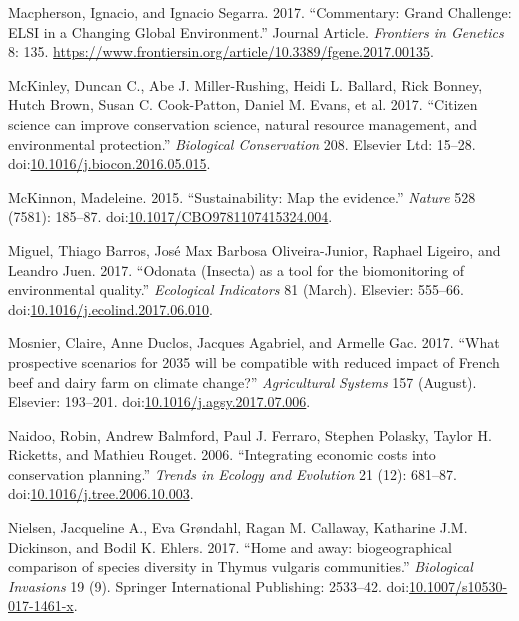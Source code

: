 \documentclass[fleqn,10pt]{wlpeerj} %
\begin{document}
\hypertarget{ref-Macpherson2017}{}
Macpherson, Ignacio, and Ignacio Segarra. 2017. ``Commentary: Grand
Challenge: ELSI in a Changing Global Environment.'' Journal Article.
\emph{Frontiers in Genetics} 8: 135.
\url{https://www.frontiersin.org/article/10.3389/fgene.2017.00135}.

\hypertarget{ref-McKinley2017}{}
McKinley, Duncan C., Abe J. Miller-Rushing, Heidi L. Ballard, Rick
Bonney, Hutch Brown, Susan C. Cook-Patton, Daniel M. Evans, et al. 2017.
``Citizen science can improve conservation science, natural resource
management, and environmental protection.'' \emph{Biological
Conservation} 208. Elsevier Ltd: 15--28.
doi:\href{https://doi.org/10.1016/j.biocon.2016.05.015}{10.1016/j.biocon.2016.05.015}.

\hypertarget{ref-McKinnon2015}{}
McKinnon, Madeleine. 2015. ``Sustainability: Map the evidence.''
\emph{Nature} 528 (7581): 185--87.
doi:\href{https://doi.org/10.1017/CBO9781107415324.004}{10.1017/CBO9781107415324.004}.

\hypertarget{ref-Miguel2017}{}
Miguel, Thiago Barros, José Max Barbosa Oliveira-Junior, Raphael
Ligeiro, and Leandro Juen. 2017. ``Odonata (Insecta) as a tool for the
biomonitoring of environmental quality.'' \emph{Ecological Indicators}
81 (March). Elsevier: 555--66.
doi:\href{https://doi.org/10.1016/j.ecolind.2017.06.010}{10.1016/j.ecolind.2017.06.010}.

\hypertarget{ref-Mosnier2017}{}
Mosnier, Claire, Anne Duclos, Jacques Agabriel, and Armelle Gac. 2017.
``What prospective scenarios for 2035 will be compatible with reduced
impact of French beef and dairy farm on climate change?''
\emph{Agricultural Systems} 157 (August). Elsevier: 193--201.
doi:\href{https://doi.org/10.1016/j.agsy.2017.07.006}{10.1016/j.agsy.2017.07.006}.

\hypertarget{ref-Naidoo2006}{}
Naidoo, Robin, Andrew Balmford, Paul J. Ferraro, Stephen Polasky, Taylor
H. Ricketts, and Mathieu Rouget. 2006. ``Integrating economic costs into
conservation planning.'' \emph{Trends in Ecology and Evolution} 21 (12):
681--87.
doi:\href{https://doi.org/10.1016/j.tree.2006.10.003}{10.1016/j.tree.2006.10.003}.

\hypertarget{ref-Nielsen2017}{}
Nielsen, Jacqueline A., Eva Grøndahl, Ragan M. Callaway, Katharine J.M.
Dickinson, and Bodil K. Ehlers. 2017. ``Home and away: biogeographical
comparison of species diversity in Thymus vulgaris communities.''
\emph{Biological Invasions} 19 (9). Springer International Publishing:
2533--42.
doi:\href{https://doi.org/10.1007/s10530-017-1461-x}{10.1007/s10530-017-1461-x}.
\end{document}
